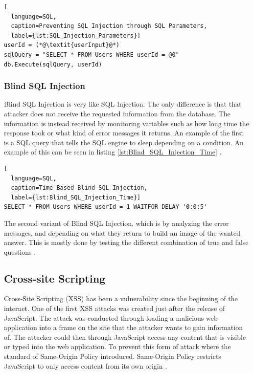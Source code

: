 \hfill
\begin{lstlisting}[
  language=SQL,
  caption=Preventing SQL Injection through SQL Parameters,
  label={lst:SQL_Injection_Parameters}]
userId = (*@\textit{userInput}@*)
sqlQuery = "SELECT * FROM Users WHERE userId = @0"
db.Execute(sqlQuery, userId)
\end{lstlisting}


\subsubsection{Blind SQL Injection}
Blind SQL Injection is very like SQL Injection. The only difference is that that attacker does not receive the requested information from the database. The information is instead received by monitoring variables such as how long time the response took or what kind of error messages it returns. An example of the first is a SQL query that tells the SQL engine to sleep depending on a condition. An example of this can be seen in listing \ref{lst:Blind_SQL_Injection_Time} \parencite{JustinClarke-Salt2009SIAa, Secure_Web}.

\hfill
\begin{lstlisting}[
  language=SQL,
  caption=Time Based Blind SQL Injection,
  label={lst:Blind_SQL_Injection_Time}]
SELECT * FROM Users WHERE userId = 1 WAITFOR DELAY '0:0:5'
\end{lstlisting}
\hfill

The second variant of Blind SQL Injection, which is by analyzing the error messages, and depending on what they return to build an image of the wanted answer. This is mostly done by testing the different combination of true and false questions \parencite{JustinClarke-Salt2009SIAa, Secure_Web}.


\subsection{Cross-site Scripting}
Cross-Site Scripting (XSS) has been a vulnerability since the beginning of the internet. One of the first XSS attacks was created just after the release of JavaScript. The attack was conducted through loading a malicious web application into a frame on the site that the attacker wants to gain information of. The attacker could then through JavaScript access any content that is visible or typed into the web application. To prevent this form of attack where the standard of Same-Origin Policy introduced. Same-Origin Policy restricts JavaScript to only access content from its own origin \parencite{FogieSeth2007Xacs, w3csop}.

